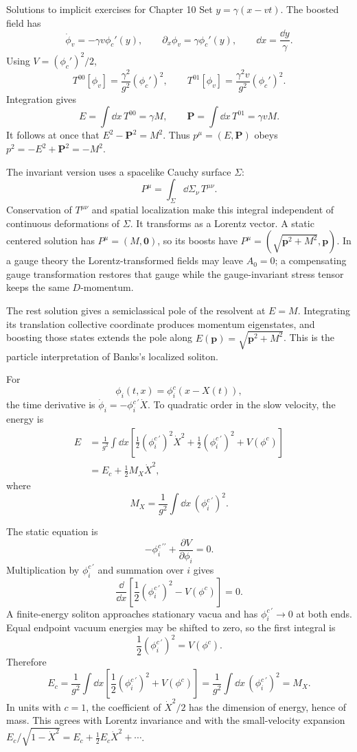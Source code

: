 \begin{bankssolutions}{Solutions to implicit exercises for Chapter 10}
Set $y=\gamma(x-vt)$.  The boosted field has
\[
  \dot\phi_v=-\gamma v\phi_c'(y),
  \qquad
  \partial_x\phi_v=\gamma\phi_c'(y),
  \qquad
  \dd x=\frac{\dd y}{\gamma}.
\]
Using $V=(\phi_c')^2/2$,
\[
  T^{00}[\phi_v]=\frac{\gamma^2}{g^2}(\phi_c')^2,
  \qquad
  T^{01}[\phi_v]=\frac{\gamma^2v}{g^2}(\phi_c')^2.
\]
Integration gives
\[
  E=\int\dd x\,T^{00}=\gamma M,
  \qquad
  \mathbf P=\int\dd x\,T^{01}=\gamma vM.
\]
It follows at once that $E^2-\mathbf P^2=M^2$.  Thus
$p^\mu=(E,\mathbf P)$ obeys $p^2=-E^2+\mathbf P^2=-M^2$.

The invariant version uses a spacelike Cauchy surface $\Sigma$:
\[
  P^\mu=\int_\Sigma\dd\Sigma_\nu\,T^{\mu\nu}.
\]
Conservation of $T^{\mu\nu}$ and spatial localization make this integral
independent of continuous deformations of $\Sigma$.  It transforms as a
Lorentz vector.  A static centered solution has $P^\mu=(M,\mathbf0)$, so its
boosts have $P^\mu=(\sqrt{\mathbf p^2+M^2},\mathbf p)$.  In a gauge theory the
Lorentz-transformed fields may leave $A_0=0$; a compensating gauge
transformation restores that gauge while the gauge-invariant stress tensor
keeps the same $D$-momentum.

The rest solution gives a semiclassical pole of the resolvent at $E=M$.
Integrating its translation collective coordinate produces momentum
eigenstates, and boosting those states extends the pole along
$E(\mathbf p)=\sqrt{\mathbf p^2+M^2}$.  This is the particle interpretation
of Banks's localized soliton.

For
\[
  \phi_i(t,x)=\phi_i^c(x-X(t)),
\]
the time derivative is
$\dot\phi_i=-\phi_i^{c\,\prime}\dot X$.  To quadratic order in the slow
velocity, the energy is
\[
\begin{aligned}
  E
  &=\frac1{g^2}\int\dd x\left[
    \frac12(\phi_i^{c\,\prime})^2\dot X^2
    +\frac12(\phi_i^{c\,\prime})^2+V(\phi^c)\right]\\
  &=E_c+\frac12M_X\dot X^2,
\end{aligned}
\]
where
\[
  M_X=\frac1{g^2}\int\dd x\,(\phi_i^{c\,\prime})^2.
\]

The static equation is
\[
  -\phi_i^{c\,\prime\prime}+\frac{\partial V}{\partial\phi_i}=0.
\]
Multiplication by $\phi_i^{c\,\prime}$ and summation over $i$ gives
\[
  \frac{\dd}{\dd x}
  \left[\frac12(\phi_i^{c\,\prime})^2-V(\phi^c)\right]=0.
\]
A finite-energy soliton approaches stationary vacua and has
$\phi_i^{c\,\prime}\to0$ at both ends.  Equal endpoint vacuum energies may be
shifted to zero, so the first integral is
\[
  \frac12(\phi_i^{c\,\prime})^2=V(\phi^c).
\]
Therefore
\[
  E_c=\frac1{g^2}\int\dd x\left[
  \frac12(\phi_i^{c\,\prime})^2+V(\phi^c)\right]
  =\frac1{g^2}\int\dd x\,(\phi_i^{c\,\prime})^2=M_X.
\]
In units with $c=1$, the coefficient of $\dot X^2/2$ has the dimension of
energy, hence of mass.  This agrees with Lorentz invariance and with the
small-velocity expansion
$E_c/\sqrt{1-\dot X^2}=E_c+\tfrac12E_c\dot X^2+\cdots$.


\end{bankssolutions}
